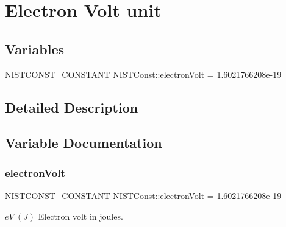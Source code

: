 \hypertarget{group___n_i_s_t_const-_electron_volt_unit}{}\section{Electron Volt unit}
\label{group___n_i_s_t_const-_electron_volt_unit}
\subsection*{Variables}
\begin{DoxyCompactItemize}
\item 
N\+I\+S\+T\+C\+O\+N\+S\+T\+\_\+\+C\+O\+N\+S\+T\+A\+NT \mbox{\hyperlink{group___n_i_s_t_const-_electron_volt_unit_ga83756881e375cccc1827b15bd46bdae4}{N\+I\+S\+T\+Const\+::electron\+Volt}} = 1.\+6021766208e-\/19
\end{DoxyCompactItemize}


\subsection{Detailed Description}


\subsection{Variable Documentation}
\mbox{\label{group___n_i_s_t_const-_electron_volt_unit_ga83756881e375cccc1827b15bd46bdae4}} 
\subsubsection{\texorpdfstring{electron\+Volt}{electronVolt}}
{\footnotesize\ttfamily N\+I\+S\+T\+C\+O\+N\+S\+T\+\_\+\+C\+O\+N\+S\+T\+A\+NT N\+I\+S\+T\+Const\+::electron\+Volt = 1.\+6021766208e-\/19}

$eV \ (J)$ Electron volt in joules. 